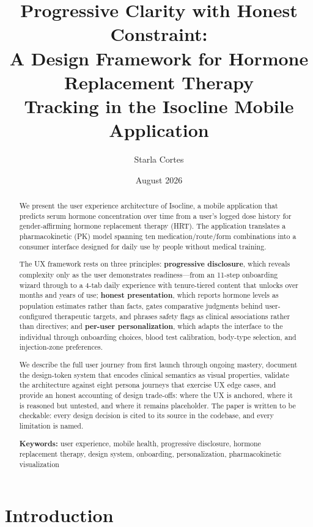 \documentclass[11pt,a4paper]{article}
\title{\textbf{Progressive Clarity with Honest Constraint:}\\[0.3em]
\large A Design Framework for Hormone Replacement Therapy\\
Tracking in the Isocline Mobile Application}
\author{Starla Cortes}
\date{August 2026}
\begin{document}
\maketitle

\begin{abstract}
\noindent
We present the user experience architecture of Isocline, a mobile application
that predicts serum hormone concentration over time from a user's logged
dose history for gender-affirming hormone replacement therapy (HRT). The
application translates a pharmacokinetic (PK) model spanning ten
medication/route/form combinations into a consumer interface designed for
daily use by people without medical training.

The UX framework rests on three principles: \textbf{progressive
disclosure}, which reveals complexity only as the user demonstrates
readiness---from an 11-step onboarding wizard through to a 4-tab daily
experience with tenure-tiered content that unlocks over months and years
of use; \textbf{honest presentation}, which reports hormone levels as
population estimates rather than facts, gates comparative judgments
behind user-configured therapeutic targets, and phrases safety flags as
clinical associations rather than directives; and \textbf{per-user
personalization}, which adapts the interface to the individual through
onboarding choices, blood test calibration, body-type selection, and
injection-zone preferences.

We describe the full user journey from first launch through ongoing
mastery, document the design-token system that encodes clinical semantics
as visual properties, validate the architecture against eight persona
journeys that exercise UX edge cases, and provide an honest accounting of
design trade-offs: where the UX is anchored, where it is reasoned but
untested, and where it remains placeholder. The paper is written to be
checkable: every design decision is cited to its source in the codebase,
and every limitation is named.

\textbf{Keywords:} user experience, mobile health, progressive
disclosure, hormone replacement therapy, design system, onboarding,
personalization, pharmacokinetic visualization
\end{abstract}

\tableofcontents
\clearpage

\section{Introduction}
\label{sec:intro}
\end{document}
